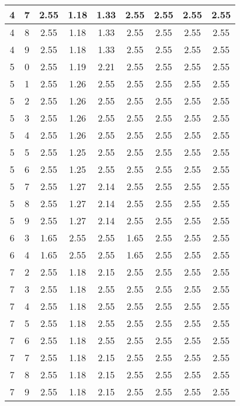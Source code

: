 \begin{longtable}{|c|c||c||c|c||c|c|c|c|}
	4 & 7 & 2.55 & 1.18 & 1.33 & 2.55 & 2.55 & 2.55 & 2.55 \\ \hline
	4 & 8 & 2.55 & 1.18 & 1.33 & 2.55 & 2.55 & 2.55 & 2.55 \\ \hline
	4 & 9 & 2.55 & 1.18 & 1.33 & 2.55 & 2.55 & 2.55 & 2.55 \\ \hline
	5 & 0 & 2.55 & 1.19 & 2.21 & 2.55 & 2.55 & 2.55 & 2.55 \\ \hline
	5 & 1 & 2.55 & 1.26 & 2.55 & 2.55 & 2.55 & 2.55 & 2.55 \\ \hline
	5 & 2 & 2.55 & 1.26 & 2.55 & 2.55 & 2.55 & 2.55 & 2.55 \\ \hline
	5 & 3 & 2.55 & 1.26 & 2.55 & 2.55 & 2.55 & 2.55 & 2.55 \\ \hline
	5 & 4 & 2.55 & 1.26 & 2.55 & 2.55 & 2.55 & 2.55 & 2.55 \\ \hline
	5 & 5 & 2.55 & 1.25 & 2.55 & 2.55 & 2.55 & 2.55 & 2.55 \\ \hline
	5 & 6 & 2.55 & 1.25 & 2.55 & 2.55 & 2.55 & 2.55 & 2.55 \\ \hline
	5 & 7 & 2.55 & 1.27 & 2.14 & 2.55 & 2.55 & 2.55 & 2.55 \\ \hline
	5 & 8 & 2.55 & 1.27 & 2.14 & 2.55 & 2.55 & 2.55 & 2.55 \\ \hline
	5 & 9 & 2.55 & 1.27 & 2.14 & 2.55 & 2.55 & 2.55 & 2.55 \\ \hline
	6 & 3 & 1.65 & 2.55 & 2.55 & 1.65 & 2.55 & 2.55 & 2.55 \\ \hline
	6 & 4 & 1.65 & 2.55 & 2.55 & 1.65 & 2.55 & 2.55 & 2.55 \\ \hline
	7 & 2 & 2.55 & 1.18 & 2.15 & 2.55 & 2.55 & 2.55 & 2.55 \\ \hline
	7 & 3 & 2.55 & 1.18 & 2.55 & 2.55 & 2.55 & 2.55 & 2.55 \\ \hline
	7 & 4 & 2.55 & 1.18 & 2.55 & 2.55 & 2.55 & 2.55 & 2.55 \\ \hline
	7 & 5 & 2.55 & 1.18 & 2.55 & 2.55 & 2.55 & 2.55 & 2.55 \\ \hline
	7 & 6 & 2.55 & 1.18 & 2.55 & 2.55 & 2.55 & 2.55 & 2.55 \\ \hline
	7 & 7 & 2.55 & 1.18 & 2.15 & 2.55 & 2.55 & 2.55 & 2.55 \\ \hline
	7 & 8 & 2.55 & 1.18 & 2.15 & 2.55 & 2.55 & 2.55 & 2.55 \\ \hline
	7 & 9 & 2.55 & 1.18 & 2.15 & 2.55 & 2.55 & 2.55 & 2.55 \\ \hline
\end{longtable}

